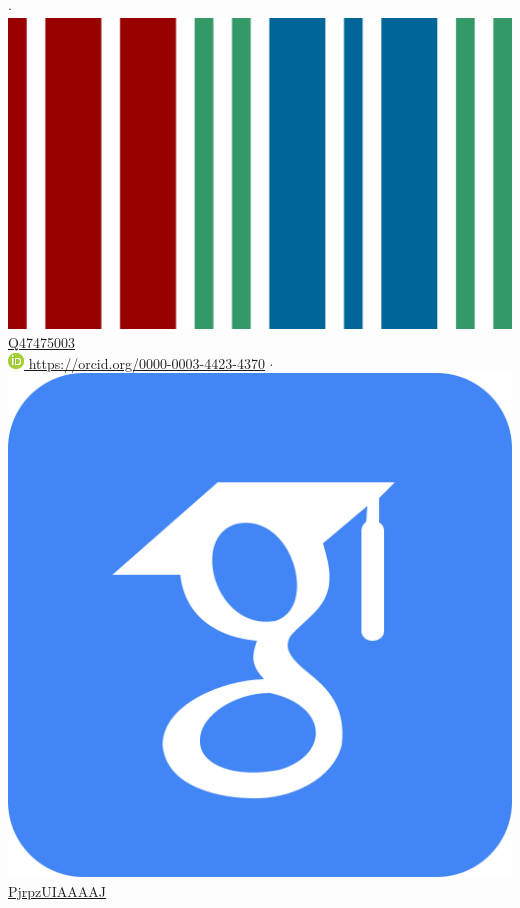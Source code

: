 \documentclass[11pt,a4paper,sans]{moderncv} %
\begin{document}
$\cdot$
\href{https://bioregistry.io/wikidata:Q47475003}{\includegraphics[scale=0.01]{img/wikidata_logo} Q47475003}
\\
\href{https://orcid.org/0000-0003-4423-4370}{\includegraphics[scale=0.5]{img/ORCIDiD_icon16x16} https://orcid.org/0000-0003-4423-4370}
$\cdot$
\href{https://scholar.google.com/citations?user=PjrpzUIAAAAJ}{\includegraphics[scale=0.015625]{img/google_scholar_icon_130918} PjrpzUIAAAAJ}
\end{document}
